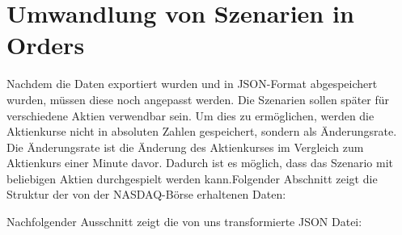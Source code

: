 \section{Umwandlung von Szenarien in Orders}
Nachdem die Daten exportiert wurden und in JSON-Format abgespeichert wurden, müssen diese noch angepasst werden.
Die Szenarien sollen später für verschiedene Aktien verwendbar sein. Um dies zu ermöglichen, werden die Aktienkurse nicht in 
absoluten Zahlen gespeichert, sondern als Änderungsrate.
Die Änderungsrate ist die Änderung des Aktienkurses im Vergleich zum Aktienkurs einer Minute davor.
Dadurch ist es möglich, dass das Szenario mit beliebigen Aktien durchgespielt werden kann.Folgender Abschnitt zeigt die Struktur der von der NASDAQ-Börse erhaltenen Daten:


Nachfolgender Ausschnitt zeigt die von uns transformierte JSON Datei:



